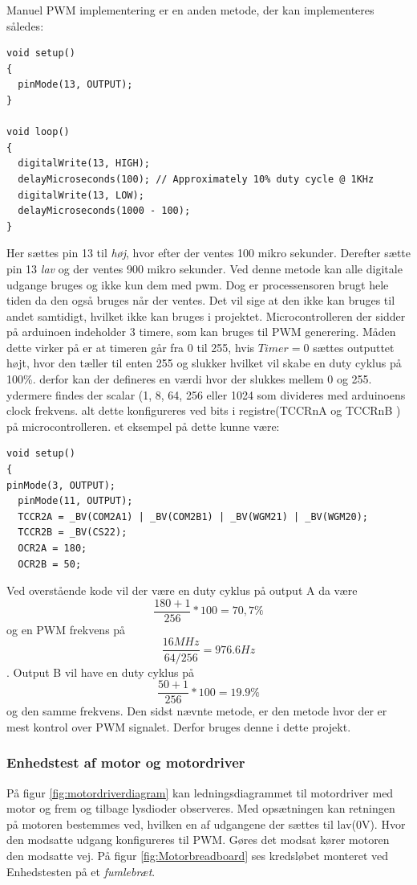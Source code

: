 Manuel PWM implementering er en anden metode, der kan implementeres således:

\begin{lstlisting}
void setup()
{
  pinMode(13, OUTPUT);
}

void loop()
{
  digitalWrite(13, HIGH);
  delayMicroseconds(100); // Approximately 10% duty cycle @ 1KHz
  digitalWrite(13, LOW);
  delayMicroseconds(1000 - 100);
}
\end{lstlisting}

Her sættes pin 13 til \textit{høj}, hvor efter der ventes 100 mikro sekunder. Derefter sætte pin 13 \textit{lav} og der ventes 900 mikro sekunder. Ved denne metode kan alle digitale udgange bruges og ikke kun dem med pwm. Dog er processensoren brugt hele tiden da den også bruges når der ventes. Det vil sige at den ikke kan bruges til andet samtidigt, hvilket ikke kan bruges i projektet.
Microcontrolleren der sidder på arduinoen indeholder 3 timere, som kan bruges til PWM generering.  Måden dette virker på er at timeren går fra 0 til 255, hvis $Timer=0$ sættes outputtet højt, hvor den tæller til enten 255 og slukker hvilket vil skabe en duty cyklus på 100\%. derfor kan der defineres en værdi hvor der slukkes mellem 0 og 255. ydermere findes der scalar (1, 8, 64, 256 eller 1024 som divideres med arduinoens clock frekvens. alt dette konfigureres ved bits i registre(TCCRnA og TCCRnB ) på microcontrolleren. et eksempel på dette kunne være: 

\begin{lstlisting}
void setup()
{
pinMode(3, OUTPUT);
  pinMode(11, OUTPUT);
  TCCR2A = _BV(COM2A1) | _BV(COM2B1) | _BV(WGM21) | _BV(WGM20);
  TCCR2B = _BV(CS22);
  OCR2A = 180;
  OCR2B = 50;
\end{lstlisting}

Ved overstående kode vil der være en duty cyklus på output A da være $$\frac{180+1}{256}*100=70,7\%$$ og en PWM frekvens på     
  $$\frac{16MHz}{64/256}=976.6Hz$$. Output B vil have en duty cyklus på $$\frac{50+1}{256}*100=19.9 \%$$ og den samme frekvens. Den sidst nævnte metode, er den metode hvor der er mest kontrol over PWM signalet. Derfor bruges denne i dette projekt.



\subsubsection{Enhedstest af motor og motordriver}
 På figur \ref{fig:motordriverdiagram} kan ledningsdiagrammet til motordriver med motor og frem og tilbage lysdioder observeres. Med opsætningen kan retningen på motoren bestemmes ved, hvilken en af udgangene der sættes til lav(0V). Hvor den modsatte udgang konfigureres til PWM. Gøres det modsat kører motoren den modsatte vej. På figur \ref{fig:Motorbreadboard} ses kredsløbet monteret ved Enhedstesten på et \textit{fumlebræt}.
 
